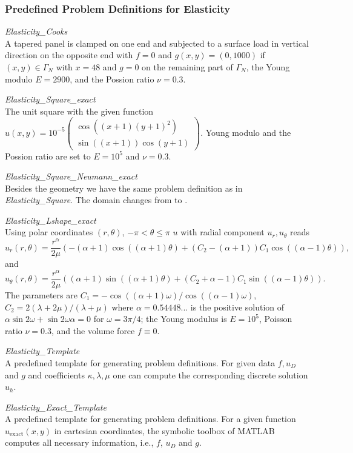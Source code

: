 \subsubsection{Predefined Problem Definitions for Elasticity}$ $\\

\noindent\emph{Elasticity\_Cooks}\smallskip\\
A tapered panel is clamped on one end and subjected to a surface load in
vertical direction on the opposite end with $f = 0$ and $g(x, y) = (0, 1000)$ if
$(x, y) \in  \Gamma_N$ with $x = 48$ and $g = 0$ on the remaining part of $\Gamma_N$, the Young modulo $E =
2900$, and the Possion ratio $\nu = 0.3$.
\bigskip


\noindent\emph{Elasticity\_Square\_exact}\smallskip\\
The unit square with the given function $u(x,y)=10^{-5}\left(\begin{smallmatrix} \cos((x+1)(y+1)^2) \\
\sin((x+1))\cos(y+1) \end{smallmatrix}\right)$. Young modulo and the Possion ratio are set to $E=10^5$ and $\nu = 0.3$.
\bigskip


\noindent\emph{Elasticity\_Square\_Neumann\_exact}\smallskip\\
Besides the geometry we have the same problem definition as in \emph{Elasticity\_Square}. The domain changes from  to .
\bigskip


\noindent\emph{Elasticity\_Lshape\_exact}\smallskip\\
Using polar coordinates $(r, \theta)$, $-\pi < \theta \leq \pi$ $u$ with radial component $u_r,u_\theta$ reads
$$
u_{r}(r,\theta) = \frac{r^{\alpha}}{2\mu}
    (-(\alpha+1)\cos((\alpha+1)\theta)+
           \nonumber     (C_{2}-
    (\alpha+1))C_{1}\cos((\alpha-1)\theta)),
$$
and
$$ u_{\theta}(r,\theta) = \frac{r^{\alpha}}{2\mu}
    ((\alpha+1)\sin((\alpha+1)\theta)+
          \nonumber     (C_{2}+\alpha-1)C_{1}\sin((\alpha-1)\theta)).
$$
The parameters are
$C_{1}=-\cos((\alpha+1)\omega)/\cos((\alpha-1)\omega)$, $C_{2} = 2(\lambda+2\mu)/(\lambda+\mu)$ where $\alpha = 0.54448...$ is the positive solution of  $\alpha \sin 2\omega + \sin 2\omega\alpha = 0$ for $ \omega= 3 \pi /4$; the Young modulus is $E=10^5$, Poisson ratio $\nu = 0.3$, and the volume force $f\equiv 0$.
\bigskip


\noindent\emph{Elasticity\_Template}\smallskip\\
A predefined template for generating problem definitions. For given data $f,u_D$ and $g$ and coefficients $\kappa,\lambda,\mu$ one can compute the corresponding discrete solution $u_h$.
\bigskip


\noindent\emph{Elasticity\_Exact\_Template}\smallskip\\
A predefined template for generating problem definitions. For a given function $u_{\text{exact}}(x,y)$ in cartesian coordinates, the symbolic toolbox of MATLAB computes all necessary information, i.e., $f$, $u_D$ and $g$. 